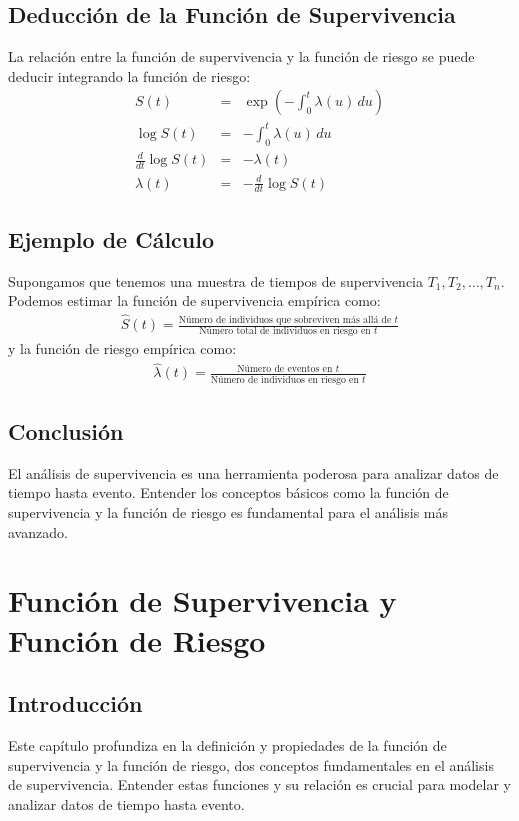 \documentclass[a4paper]{report} %
\begin{document}
\section{Deducci\'on de la Funci\'on de Supervivencia}
La relaci\'on entre la funci\'on de supervivencia y la funci\'on de riesgo se puede deducir integrando la funci\'on de riesgo:
\begin{eqnarray*}
S(t) &=& \exp\left(-\int_0^t \lambda(u) \, du\right) \\
\log S(t) &=& -\int_0^t \lambda(u) \, du \\
\frac{d}{dt} \log S(t) &=& -\lambda(t) \\
\lambda(t) &=& -\frac{d}{dt} \log S(t)
\end{eqnarray*}

\section{Ejemplo de C\'alculo}
Supongamos que tenemos una muestra de tiempos de supervivencia $T_1, T_2, \ldots, T_n$. Podemos estimar la funci\'on de supervivencia emp\'irica como:
\begin{eqnarray*}
\hat{S}(t) = \frac{\text{N\'umero de individuos que sobreviven m\'as all\'a de } t}{\text{N\'umero total de individuos en riesgo en } t}
\end{eqnarray*}
y la funci\'on de riesgo emp\'irica como:
\begin{eqnarray*}
\hat{\lambda}(t) = \frac{\text{N\'umero de eventos en } t}{\text{N\'umero de individuos en riesgo en } t}
\end{eqnarray*}

\section{Conclusi\'on}
El an\'alisis de supervivencia es una herramienta poderosa para analizar datos de tiempo hasta evento. Entender los conceptos b\'asicos como la funci\'on de supervivencia y la funci\'on de riesgo es fundamental para el an\'alisis m\'as avanzado.


\chapter{Funci\'on de Supervivencia y Funci\'on de Riesgo}
\section{Introducci\'on}
Este cap\'itulo profundiza en la definici\'on y propiedades de la funci\'on de supervivencia y la funci\'on de riesgo, dos conceptos fundamentales en el an\'alisis de supervivencia. Entender estas funciones y su relaci\'on es crucial para modelar y analizar datos de tiempo hasta evento.
\end{document}
